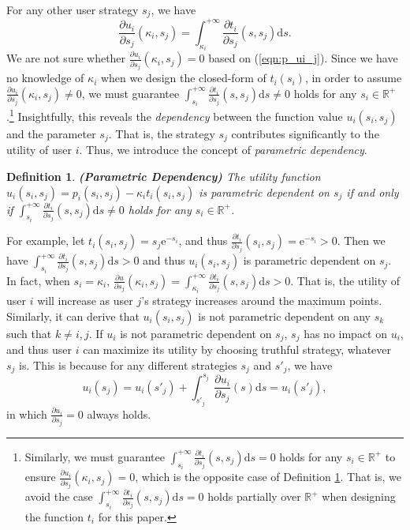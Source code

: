 \documentclass[conference]{IEEEtran}
\newtheorem{definition}{Definition}
\theoremstyle{definition}
\begin{document}
{For any other user strategy $s_j$, we have
\begin{equation}
\label{eqn:p_ui_j}
\frac{\partial u_i}{\partial s_j}(\kappa_i,s_j)=\int_{\kappa_i}^{+\infty}\frac{\partial t_i}{\partial s_j}(s,s_j)\mathrm{d}s.
\end{equation}
We are not sure whether $\frac{\partial u_i}{\partial s_j}(\kappa_i,s_j)=0$ based on (\ref{eqn:p_ui_j}). Since we have no knowledge of $\kappa_i$ when we design the closed-form of $t_i(s_i)$, in order to assume $\frac{\partial u_i}{\partial s_j}(\kappa_i,s_j)\not=0$, we must guarantee $\int_{s_i}^{+\infty}\frac{\partial t_i}{\partial s_j}(s,s_j)\mathrm{d}s\not=0$ holds for any $s_i\in\mathbb{R}^+$.\footnote{Similarly, we must guarantee $\int_{s_i}^{+\infty}\frac{\partial t_i}{\partial s_j}(s,s_j)\mathrm{d}s=0$ holds for any $s_i\in\mathbb{R}^+$ to ensure $\frac{\partial u_i}{\partial s_j}(\kappa_i,s_j)=0$, which is the opposite case of Definition \ref{def:pd}. That is, we avoid the case $\int_{s_i}^{+\infty}\frac{\partial t_i}{\partial s_j}(s,s_j)\mathrm{d}s=0$ holds partially over $\mathbb{R}^+$ when designing the function $t_i$ for this paper.} Insightfully, this reveals the \emph{dependency} between the function value $u_i(s_i,s_j)$ and the parameter $s_j$. That is, the strategy $s_j$ contributes significantly to the utility of user $i$. Thus, we introduce the concept of \emph{parametric dependency}.
\begin{definition}
\label{def:pd}
\textbf{(Parametric Dependency)} The utility function $u_i(s_i,s_j)=p_i(s_i,s_j)-\kappa_it_i(s_i,s_j)$ is parametric dependent on $s_j$ if and only if $\int_{s_i}^{+\infty}\frac{\partial t_i}{\partial s_j}(s,s_j)\mathrm{d}s\not=0$ holds for any $s_i\in\mathbb{R}^+$.
\end{definition}
For example, let $t_i(s_i,s_j)=s_j\mathrm{e}^{-s_i}$, and thus $\frac{\partial t_i}{\partial s_j}(s_i,s_j)=\mathrm{e}^{-s_i}>0$. Then we have $\int_{s_i}^{+\infty}\frac{\partial t_i}{\partial s_j}(s,s_j)\mathrm{d}s>0$ and thus $u_i(s_i,s_j)$ is parametric dependent on $s_j$. In fact, when $s_i=\kappa_i$, $\frac{\partial u}{\partial s_j}(\kappa_i,s_j)=\int_{\kappa_i}^{+\infty}\frac{\partial t_i}{\partial s_j}(s,s_j)\mathrm{d}s>0$. That is, the utility of user $i$ will increase as user $j$\rq{}s strategy increases around the maximum points. Similarly, it can derive that $u_i(s_i,s_j)$ is not parametric dependent on any $s_k$ such that $k\not=i,j$. If $u_i$ is not parametric dependent on $s_j$, $s_j$ has no impact on $u_i$, and thus user $i$ can maximize its utility by choosing truthful strategy, whatever $s_j$ is. This is because for any different strategies $s_j$ and $s'_j$, we have
\begin{equation}
\label{eqn:unpd}
u_i(s_j)=u_i(s'_j)+\int_{s'_j}^{s_j}\frac{\partial u_i}{\partial s_j}(s)\mathrm{d}s=u_i(s'_j),
\end{equation}
in which $\frac{\partial u_i}{\partial s_j}=0$ always holds.
}
\end{document}
